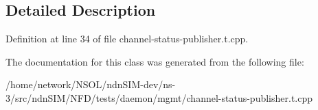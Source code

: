 \subsection{Detailed Description}


Definition at line 34 of file channel-\/status-\/publisher.\+t.\+cpp.



The documentation for this class was generated from the following file\+:\begin{DoxyCompactItemize}
\item 
/home/network/\+N\+S\+O\+L/ndn\+S\+I\+M-\/dev/ns-\/3/src/ndn\+S\+I\+M/\+N\+F\+D/tests/daemon/mgmt/channel-\/status-\/publisher.\+t.\+cpp\end{DoxyCompactItemize}
